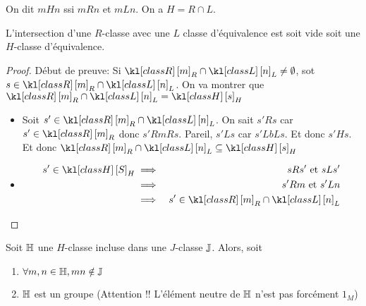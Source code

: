 \begin{definition}
	On dit $m H n$ ssi $m R n $ et $m L n$. On a $H = R \cap L$.
\end{definition}

\begin{exercice}
	L'intersection d'une $R$-classe avec une $L$ classe d'équivalence est soit vide soit une $H$-classe d'équivalence.
\end{exercice}

\begin{proof}
	Début de preuve:
	Si $\classr m \cap \classl n \neq \emptyset$, sot $s \in \classr m \cap \classl n$. On va montrer que
	$\classr m \cap \classl n = \classh s$

	\begin{itemize}
		\item
		      Soit $s' \in \classr m \cap \classl n$. On sait $s' R s$ car $s' \in \classr m$ donc $s' R m R s$.
		      Pareil, $s' L s$ car  $s' L b L s$.
		      Et donc $s' H s$. Et donc $\classr m \cap \classl n \subseteq \classh s$

		\item
		      \begin{eqnarray}
			      s' \in \classh S &\implies& s R s' \et s L s'\\
			      &\implies& s' R m \et s' L n\\
			      &\implies& s' \in \classr m \cap \classl n
		      \end{eqnarray}

	\end{itemize}
\end{proof}

\begin{lemma}
	Soit $\mathbb{H}$ une $H$-classe incluse dans une $J$-classe $\mathbb{J}$. Alors, soit
	\begin{enumerate}
		\item $\forall m,n \in \mathbb{H}, mn \notin \mathbb{J}$
		\item $\mathbb{H}$ est un groupe (Attention !! L'élément neutre de $\mathbb{H}$ n'est pas forcément $1_M$)
	\end{enumerate}
\end{lemma}

